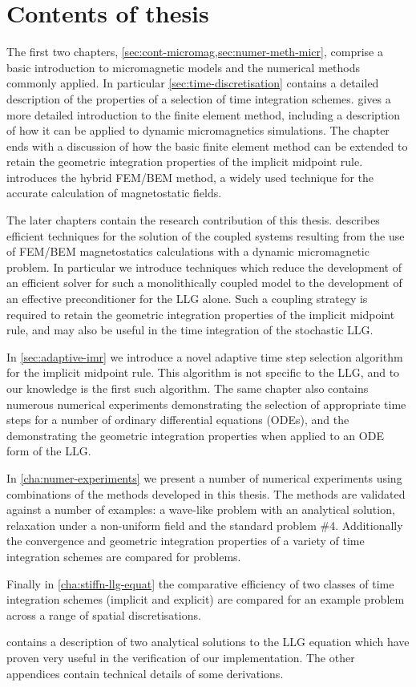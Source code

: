 \section{Contents of thesis}

The first two chapters, \cref{sec:cont-micromag,sec:numer-meth-micr}, comprise a basic introduction to micromagnetic models and the numerical methods commonly applied.
In particular \cref{sec:time-discretisation} contains a detailed description of the properties of a selection of time integration schemes.
 gives a more detailed introduction to the finite element method, including a description of how it can be applied to dynamic micromagnetics simulations.
The chapter ends with a discussion of how the basic finite element method can be extended to retain the geometric integration properties of the implicit midpoint rule.
 introduces the hybrid FEM/BEM method, a widely used technique for the accurate calculation of magnetostatic fields.

The later chapters contain the research contribution of this thesis.
 describes efficient techniques for the solution of the coupled systems resulting from the use of FEM/BEM magnetostatics calculations with a dynamic micromagnetic problem.
In particular we introduce techniques which reduce the development of an efficient solver for such a monolithically coupled model to the development of an effective preconditioner for the LLG alone.
Such a coupling strategy is required to retain the geometric integration properties of the implicit midpoint rule, and may also be useful in the time integration of the stochastic LLG.

In \cref{sec:adaptive-imr} we introduce a novel adaptive time step selection algorithm for the implicit midpoint rule.
This algorithm is not specific to the LLG, and to our knowledge is the first such algorithm.
The same chapter also contains numerous numerical experiments demonstrating the selection of appropriate time steps for a number of ordinary differential equations (ODEs), and the demonstrating the geometric integration properties when applied to an ODE form of the LLG.

In \cref{cha:numer-experiments} we present a number of numerical experiments using combinations of the methods developed in this thesis.
The methods are validated against a number of examples: a wave-like problem with an analytical solution, relaxation under a non-uniform field and the \mumag standard problem \#4.
Additionally the convergence and geometric integration properties of a variety of time integration schemes are compared for problems.

Finally in \cref{cha:stiffn-llg-equat} the comparative efficiency of two classes of time integration schemes (implicit and explicit) are compared for an example problem across a range of spatial discretisations.

 contains a description of two analytical solutions to the LLG equation which have proven very useful in the verification of our implementation.
The other appendices contain technical details of some derivations.


